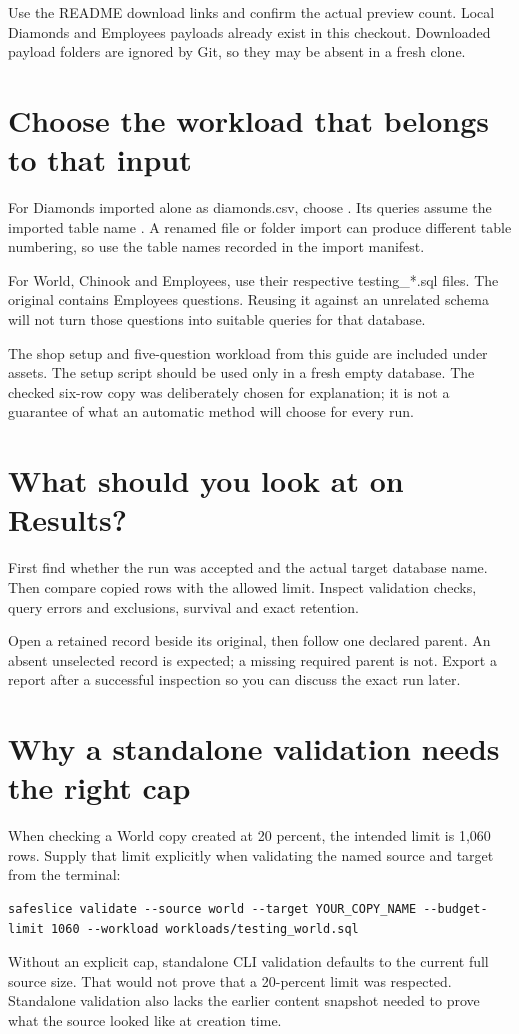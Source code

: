 \documentclass[12pt,a4paper,oneside]{report}
\begin{document}
Use the README download links and confirm the actual preview count. Local Diamonds and Employees payloads already exist in this checkout. Downloaded payload folders are ignored by Git, so they may be absent in a fresh clone.

\section{Choose the workload that belongs to that input}
For Diamonds imported alone as diamonds.csv, choose . Its queries assume the imported table name . A renamed file or folder import can produce different table numbering, so use the table names recorded in the import manifest.

For World, Chinook and Employees, use their respective testing\_*.sql files. The original  contains Employees questions. Reusing it against an unrelated schema will not turn those questions into suitable queries for that database.

The shop setup and five-question workload from this guide are included under assets. The setup script should be used only in a fresh empty database. The checked six-row copy was deliberately chosen for explanation; it is not a guarantee of what an automatic method will choose for every run.

\section{What should you look at on Results?}
First find whether the run was accepted and the actual target database name. Then compare copied rows with the allowed limit. Inspect validation checks, query errors and exclusions, survival and exact retention.

Open a retained record beside its original, then follow one declared parent. An absent unselected record is expected; a missing required parent is not. Export a report after a successful inspection so you can discuss the exact run later.

\section{Why a standalone validation needs the right cap}
When checking a World copy created at 20 percent, the intended limit is 1,060 rows. Supply that limit explicitly when validating the named source and target from the terminal:
\begin{lstlisting}[language={}]
safeslice validate --source world --target YOUR_COPY_NAME --budget-limit 1060 --workload workloads/testing_world.sql
\end{lstlisting}
Without an explicit cap, standalone CLI validation defaults to the current full source size. That would not prove that a 20-percent limit was respected. Standalone validation also lacks the earlier content snapshot needed to prove what the source looked like at creation time.
\end{document}
